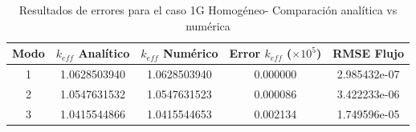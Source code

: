 \begin{table}[h]
\centering
\caption{Resultados de errores para el caso 1G Homogéneo- Comparación analítica vs numérica}
\label{tab:errores_1g}
\begin{tabular}{c|cc|cc}
\toprule
\textbf{Modo} & \textbf{$k_{eff}$ Analítico} & \textbf{$k_{eff}$ Numérico} & \textbf{Error $k_{eff}$ ($\times 10^5$)} & \textbf{RMSE Flujo} \\
\midrule
1 & 1.0628503940 & 1.0628503940 & 0.000000 & 2.985432e-07 \\
2 & 1.0547631532 & 1.0547631523 & 0.000086 & 3.422233e-06 \\
3 & 1.0415544866 & 1.0415544653 & 0.002134 & 1.749596e-05 \\
\bottomrule
\end{tabular}
\end{table}
